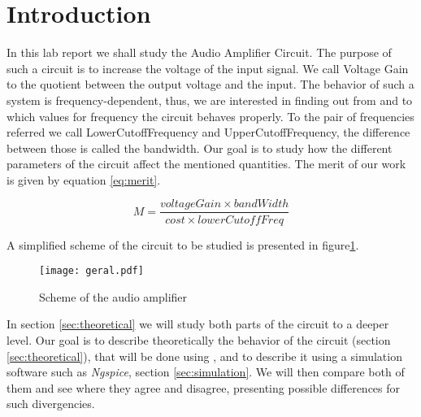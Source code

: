 \section{Introduction}
\label{sec:introduction}

\par In this lab report we shall study the Audio Amplifier Circuit. The purpose of such a circuit is to increase the voltage of the input signal. We call Voltage Gain to the quotient between the output voltage and the input. The behavior of such a system is frequency-dependent, thus, we are interested in finding out from and to which values for frequency the circuit behaves properly. To the pair of frequencies referred we call LowerCutoffFrequency and UpperCutoffFrequency, the difference between those is called the bandwidth. Our goal is to study how the different parameters of the circuit affect the mentioned quantities. The merit of our work is given by equation \ref{eq:merit}.



\begin{equation}
    M = \frac{voltageGain \times bandWidth}{cost \times lowerCutoffFreq}
    \label{eq:merit}
\end{equation}



A simplified scheme of the circuit to be studied is presented in figure\ref{fig:circuit}. 

\begin{figure}[H]   
\centering
\texttt{[image: geral.pdf]}
\caption{Scheme of the audio amplifier}
\label{fig:circuit}
\end{figure}

In section \ref{sec:theoretical} we will study both parts of the circuit to a deeper level. Our goal is to describe theoretically the behavior of the circuit (section \ref{sec:theoretical}), that will be done using , and to describe it using a simulation software such as \emph{Ngspice}, section \ref{sec:simulation}. We will then compare both of them and see where they agree and disagree, presenting possible differences for such divergencies.